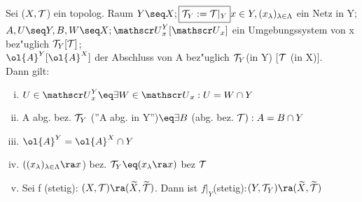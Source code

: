 \begin{prop}\label{5.2} Sei ($X,\mathcal T$) ein topolog. Raum $Y\seq X; \framebox{$\T_Y:=\T |_Y$}\\
x\in Y, (x_\lambda)_{\lambda\in\Lambda}$ ein Netz in Y; $A, U\seq Y, B,W \seq X;\\
\umg{U}{x}^Y[\umg{U}{x}]$ ein Umgebungssystem von x bez"uglich $\mathcal T_Y [\mathcal T ]$;\\
$\ol{A}^Y [\ol{A}^X ]$ der Abschluss von A bez"uglich $\mathcal T_Y$(in Y) [$\mathcal T$ (in X)].\\
Dann gilt:
\begin{enumerate}[(i)]
\item $U\in\umg{U}{x}^Y\eq\exists W\in\umg{U}{x}: U=W\cap Y$
\item A abg. bez. $\mathcal T_Y$ (''A abg. in Y'')$\eq \exists B$ (abg. bez. $\mathcal T ): A=B\cap Y$
\item $\ol{A}^Y=\ol{A}^X\cap Y$
\item $((x_\lambda )_{\lambda\in\Lambda}\ra x$) bez. $\T_Y\eq (x_\lambda\ra x)$ bez $\mathcal T$
\item Sei f (stetig): $(X,\T )\ra (\widetilde{X},\widetilde{\T})$. Dann ist $f|_Y$(stetig):$(Y,\T_Y )\ra (\widetilde{X},\widetilde{\T})$
\end{enumerate}
\end{prop}

